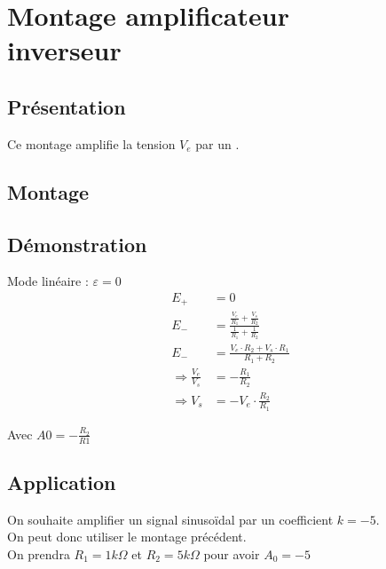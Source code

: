 


\chapter{Montage amplificateur \\inverseur}
\section{Présentation}

Ce montage amplifie la tension $V_e$ par un .

\section{Montage}


\section{Démonstration}

Mode linéaire : $\varepsilon = 0$
\begin{align}
E_+&=0 \\
E_-&= \frac{ \frac{V_e}{R_1}+\frac{V_s}{R_2} } { \frac{1}{R_1} + \frac{1}{R_2}} \\
E_-&=\frac{V_e \cdot R_2 + V_s \cdot R_1}{R_1 + R_2} \\
\Rightarrow \frac{V_e}{V_s} &= -\frac{R_1}{R_2}\\
\Rightarrow V_s &= -V_e \cdot \frac{R_2}{R_1} 
\end{align}

Avec $A0= -\frac{R_2}{R1}$

\section{Application}

\begin{exemple}
On souhaite amplifier un signal sinusoïdal par un coefficient $k=-5$.\\
On peut donc utiliser le montage précédent. \\
On prendra $R_1=1 k\Omega$ et $R_2=5k\Omega$ pour avoir $A_0=-5$

\end{exemple}
